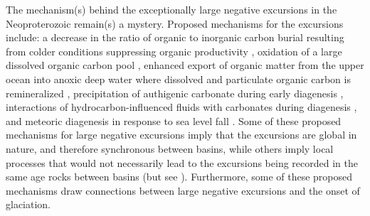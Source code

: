 The mechanism(s) behind the exceptionally large negative \dC excursions in the Neoproterozoic remain(s) a mystery. Proposed mechanisms for the excursions include: a decrease in the ratio of organic to inorganic carbon burial resulting from colder conditions suppressing organic productivity \citep{Kaufman1997a, Hoffman1998a}, oxidation of a large dissolved organic carbon pool \citep{Rothman2003a}, enhanced export of organic matter from the upper ocean into anoxic deep water where dissolved and particulate organic carbon is remineralized \citep{Tziperman2011a}, precipitation of authigenic carbonate during early diagenesis \citep{Schrag2013a}, interactions of hydrocarbon-influenced fluids with carbonates during diagenesis \citep{Derry2010a}, and meteoric diagenesis in response to sea level fall \citep{Swart2012a}. Some of these proposed mechanisms for large negative \dC excursions imply that the excursions are global in nature, and therefore synchronous between basins, while others imply local processes that would not necessarily lead to the excursions being recorded in the same age rocks between basins (but see \citealp{Swart2008a}). Furthermore, some of these proposed mechanisms draw connections between large negative \dC excursions and the onset of glaciation.


